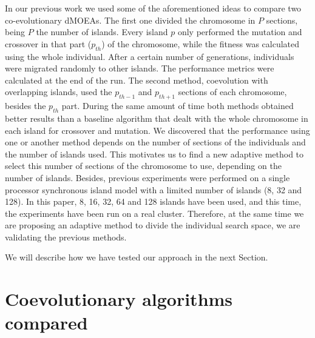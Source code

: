\documentclass[preprint]{elsarticle}
\begin{document}
In our previous work \citep{Garcia16hpmoon} we used some of
the aforementioned ideas to compare two co-evolutionary dMOEAs. The first
one divided the chromosome in $P$ sections, being $P$ the number of
islands. Every island $p$ only performed the mutation and crossover in
that part ($p_{th}$) of the chromosome, while the fitness was
calculated using the whole individual. After a certain number of
generations, individuals were migrated randomly to other islands. The
performance metrics were calculated at the end of the run. The second
method, coevolution with overlapping islands, used the $p_{th-1}$ and
$p_{th+1}$ sections of each chromosome, besides the $p_{th}$
part. During the same amount of time both methods obtained better
results than a baseline algorithm that dealt with the whole chromosome
in each island for crossover and mutation. We discovered that the
performance using one or another method depends on the number of
sections of the individuals and the number of islands used. This
motivates us to find a new adaptive method to select this number of
sections of the chromosome to use, depending on the number of
islands. Besides, previous experiments were performed on a single
processor synchronous island model with a limited number of islands
(8, 32 and 128). In this paper,  8, 16, 32, 64 and 128 islands have
been used, and this time, the experiments have been run on a real
cluster. Therefore, at the same time we are proposing an adaptive
method to divide the individual search space, we are validating the
previous methods. 


We will describe how we have tested our approach in the next Section.




%
%

\section{Coevolutionary algorithms compared}
\label{sec:coevo}
\end{document}
